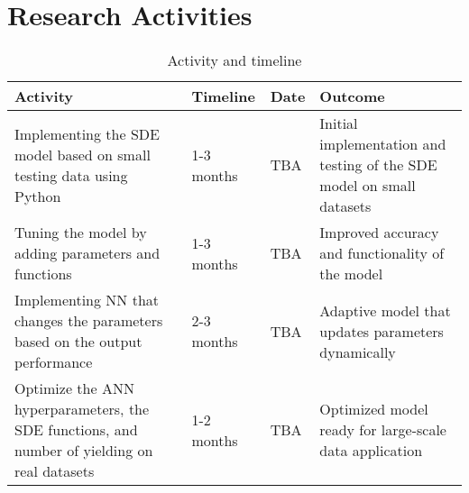 \section*{Research Activities}
\begin{table}[h!]
\centering
\begin{tabular}{|p{5cm}|p{3cm}|p{3cm}|p{5cm}|}
\hline
\textbf{Activity} & \textbf{Timeline} & \textbf{Date} & \textbf{Outcome} \\ \hline
Implementing the SDE model based on small testing data using Python & 1-3 months & TBA & Initial implementation and testing of the SDE model on small datasets \\ \hline
Tuning the model by adding parameters and functions & 1-3 months & TBA & Improved accuracy and functionality of the model \\ \hline
Implementing NN that changes the parameters based on the output performance & 2-3 months & TBA & Adaptive model that updates parameters dynamically \\ \hline
Optimize the ANN hyperparameters, the SDE functions, and number of yielding on real datasets & 1-2 months & TBA & Optimized model ready for large-scale data application \\ \hline
\end{tabular}
\caption{Activity and timeline}
\end{table}


